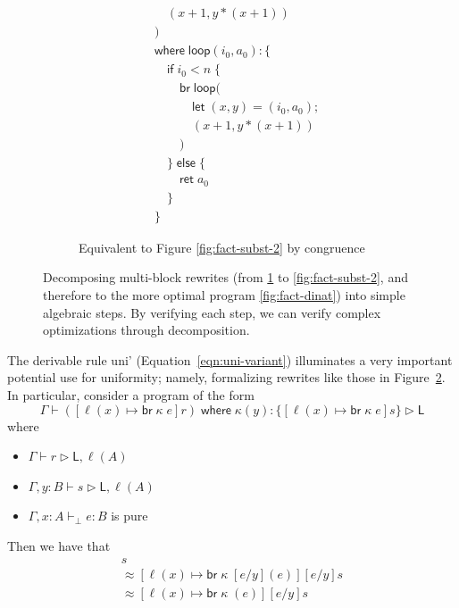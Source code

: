 \documentclass[acmsmall,screen,review]{acmart}
\newcommand{\ms}[1]{\ensuremath{\mathsf{#1}}}
\newcommand{\lto}{:}
\newcommand{\brb}[2]{\ms{br}\;#1\;#2}
\newcommand{\where}[2]{#1\;\ms{where}\;#2}
\newcommand{\wbranch}[3]{#1(#2) \lto \{#3\}}
\newcommand{\bhyp}[2]{#1 : #2}
\newcommand{\hasty}[4]{#1 \vdash_{#2} #3: {#4}}
\newcommand{\haslb}[3]{#1 \vdash #2 \rhd #3}
\newcommand{\teqv}{\approx}
\newcommand{\brle}[1]{{\textsf{#1}}}
\begin{document}
\begin{figure}
\begin{subfigure}[c]{.5\textwidth}
\begin{align*}
      & \quad(x + 1, y * (x + 1)) \\
      & ) \\
      & \ms{where}\;\ms{loop}(i_0, a_0): \{\\
      & \quad \ms{if}\;i_0 < n\;\{ \\
      & \qquad \ms{br}\;\ms{loop}( \\
      & \qquad \quad \ms{let}\;(x, y) = (i_0, a_0); \\
      & \qquad \quad (x + 1, y * (x + 1)) \\ 
      & \qquad ) \\
      & \quad \}\;\ms{else}\;\{ \\
      & \qquad \ms{ret}\;a_0 \\
      & \quad \} \\
      & \}
    \end{align*}
    \caption{Equivalent to Figure \ref{fig:fact-subst-2} by congruence}
    \label{fig:fact-zero}
  \end{subfigure}
  \caption{
    Decomposing multi-block rewrites (from \ref{fig:fact-zero} to
    \ref{fig:fact-subst-2}, and therefore to the more optimal program 
    \ref{fig:fact-dinat}) into simple algebraic steps. By verifying each step, we can
    verify complex optimizations through decomposition.
  } 
  \Description{}
  \label{fig:fact-dinat-rewrites}
\end{figure}
The derivable rule \brle{uni'} (Equation~\ref{eqn:uni-variant}) illuminates a very important
potential use for uniformity; namely, formalizing rewrites like those in
Figure~\ref{fig:fact-dinat-rewrites}. In particular, consider a program of the form 
\begin{equation*}
  \haslb{\Gamma}{\where{([\ell(x) \mapsto \brb{\kappa}{e}]r)}{
    \wbranch{\kappa}{y}{[\ell(x) \mapsto \brb{\kappa}{e}]s}
  }}{\ms{L}}
\end{equation*}
where 
\begin{itemize}
  \item $\haslb{\Gamma}{r}{\ms{L}, \ell(A)}$
  \item $\haslb{\Gamma, y : B}{s}{\ms{L}, \ell(A)}$
  \item $\hasty{\Gamma, \bhyp{x}{A}}{\bot}{e}{B}$ is pure
\end{itemize} 
Then we have that
\begin{multline*}
  [e/y][\ell(x) \mapsto \brb{\kappa}{(e)}]s 
  \\ \teqv
  [\ell(x) \mapsto \brb{\kappa}{[e/y](e)}][e/y]s
  \\ \teqv
  [\ell(x) \mapsto \brb{\kappa}{(e)}][e/y]s
\end{multline*}
\end{document}
